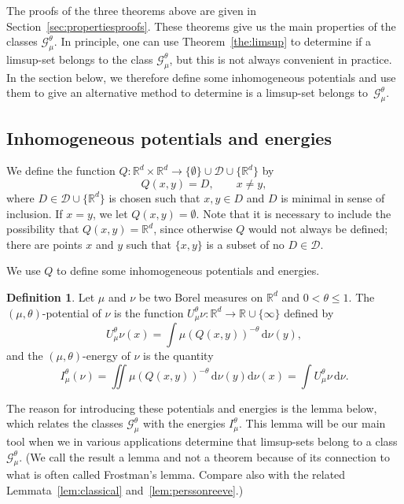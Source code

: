 \documentclass[11pt]{article}
\theoremstyle{definition}
\newtheorem{defi}[theo]{Definition}
\numberwithin{equation}{section}
\numberwithin{figure}{section}
\numberwithin{table}{section}
\newcommand*{\dd}{\mathrm{d}}
\begin{document}
The proofs of the three theorems above are given in Section~\ref{sec:propertiesproofs}. These theorems give us the main properties of the classes $\mathscr{G}_\mu^\theta$. In principle, one can use Theorem~\ref{the:limsup} to determine if a limsup-set belongs to the class $\mathscr{G}_\mu^\theta$, but this is not always convenient in practice. In the section below, we therefore define some inhomogeneous potentials and use them to give an alternative method to determine is a limsup-set belongs to~$\mathscr{G}_\mu^\theta$.


\subsection{Inhomogeneous potentials and energies} \label{sec:inhomogeneous}

We define the function $Q \colon \mathbb{R}^d \times \mathbb{R}^d \to \{\emptyset \} \cup \mathscr{D} \cup \{\mathbb{R}^d\}$ by
\[
Q (x,y) = D, \qquad x \neq y,
\]
where $D \in \mathscr{D} \cup \{ \mathbb{R}^d \}$ is chosen such that $x,y \in D$ and $D$ is minimal in sense of inclusion. If $x = y$, we let $Q (x,y) = \emptyset$. Note that it is necessary to include the possibility that $Q (x,y) = \mathbb{R}^d$, since otherwise $Q$ would not always be defined; there are points $x$ and $y$ such that $\{x, y\}$ is a subset of no $D \in \mathscr{D}$.

We use $Q$ to define some inhomogeneous potentials and energies.

\begin{defi}
Let $\mu$ and $\nu$ be two Borel measures on $\mathbb{R}^d$ and $0 < \theta \leq 1$. The $(\mu, \theta)$-potential of $\nu$ is the function $U_\mu^\theta \nu \colon \mathbb{R}^d \to \mathbb{R} \cup \{\infty\}$ defined by
\[
U_\mu^\theta \nu (x) = \int \mu (Q(x,y))^{-\theta} \, \dd \nu (y),
\]
and the $(\mu,\theta)$-energy of $\nu$ is the quantity
\[
I_\mu^\theta (\nu) = \iint \mu (Q(x,y))^{-\theta} \, \dd \nu (y) \dd \nu (x) = \int U_\mu^\theta \nu \, \dd \nu.
\]
\end{defi}

The reason for introducing these potentials and energies is the lemma below, which relates the classes $\mathscr{G}_\mu^\theta$ with the energies $I_\mu^\theta$. This lemma will be our main tool when we in various applications determine that limsup-sets belong to a class $\mathscr{G}_\mu^\theta$. (We call the result a lemma and not a theorem because of its connection to what is often called Frostman's lemma. Compare also with the related Lemmata~\ref{lem:classical} and~\ref{lem:perssonreeve}.)
\end{document}
